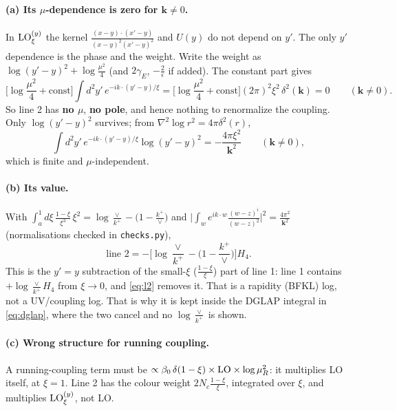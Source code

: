 \documentclass[10pt]{article}
\numberwithin{equation}{section}
\newcommand{\LO}{{\rm LO}}
\begin{document}
\paragraph{(a) Its $\mu$-dependence is zero for $\mathbf k\neq0$.} In $\LO^{(y)}_\xi$ the kernel $\frac{(x-y)\cdot(x'-y)}{(x-y)^2(x'-y)^2}$ and $U(y)$ do not depend on $y'$. The only $y'$ dependence is the phase and the weight. Write the weight as $\log(y'-y)^2+\log\frac{\mu^2}{4}$ (and $2\gamma_E$, $-\frac2\epsilon$ if added). The constant part gives
\begin{equation}
\Big[\log\frac{\mu^2}{4}+\text{const}\Big]\int d^2y'\,e^{-ik\cdot(y'-y)/\xi}=\Big[\log\frac{\mu^2}{4}+\text{const}\Big](2\pi)^2\xi^2\,\delta^2(\mathbf k)=0\qquad(\mathbf k\neq0).
\end{equation}
So line 2 has \textbf{no $\mu$}, \textbf{no pole}, and hence nothing to renormalize the coupling. Only $\log(y'-y)^2$ survives; from $\nabla^2\log r^2=4\pi\delta^2(r)$,
\begin{equation}
\int d^2y'\,e^{-ik\cdot(y'-y)/\xi}\log(y'-y)^2=-\frac{4\pi\xi^2}{\mathbf k^2}\qquad(\mathbf k\neq0),
\end{equation}
which is finite and $\mu$-independent.

\paragraph{(b) Its value.} With $\int_a^1d\xi\,\frac{1-\xi}{\xi^3}\,\xi^2=\log\frac{\vee}{k^+}-\big(1-\frac{k^+}{\vee}\big)$ and $\big|\int_w e^{ik\cdot w}\frac{(w-z)^i}{(w-z)^2}\big|^2=\frac{4\pi^2}{\mathbf k^2}$ (normalisations checked in \texttt{checks.py}),
\begin{equation}
\text{line 2}=-\Big[\log\frac{\vee}{k^+}-\Big(1-\frac{k^+}{\vee}\Big)\Big]H_4.\label{eq:l2}
\end{equation}
This is the $y'=y$ subtraction of the small-$\xi$ ($\frac{1-\xi}{\xi}$) part of line 1: line 1 contains $+\log\frac{\vee}{k^+}H_4$ from $\xi\to0$, and \eqref{eq:l2} removes it. That is a rapidity (BFKL) log, not a UV/coupling log. That is why it is kept inside the DGLAP integral in \eqref{eq:dglap}, where the two cancel and no $\log\frac{\vee}{k^+}$ is shown.

\paragraph{(c) Wrong structure for running coupling.} A running-coupling term must be $\propto\beta_0\,\delta(1-\xi)\times\LO\times\log\mu_R^2$: it multiplies LO itself, at $\xi=1$. Line 2 has the colour weight $2N_c\frac{1-\xi}{\xi}$, integrated over $\xi$, and multiplies $\LO^{(y)}_\xi$, not LO.
\end{document}
